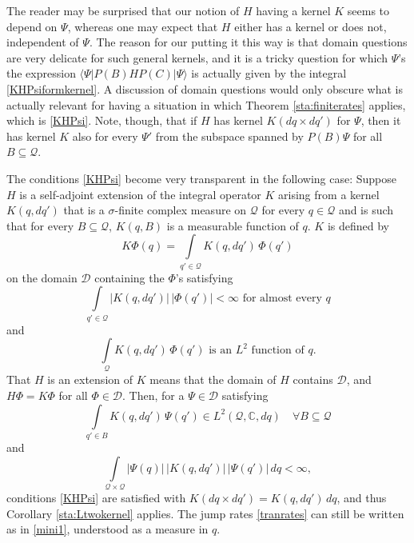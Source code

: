 \documentclass[12pt]{article}
\newcommand{\CCC}{\mathbb{C}} %
\newcommand{\1}{\mathbf{1}} %
\renewcommand{\sp}[2]{\langle #1 | #2 \rangle} %
\newcommand{\conf}{\mathcal{Q}} %
\newcommand{\pov}{{P}}%
\newcommand{\domain}{\mathscr{D}}
\begin{document}
The reader may be surprised that our notion of $H$ having a kernel $K$
seems to depend on $\Psi$, whereas one may expect that $H$ either has
a kernel or does not, independent of $\Psi$. The reason for our
putting it this way is that domain questions are very delicate for
such general kernels, and it is a tricky question for which $\Psi$'s
the expression $\sp{\Psi}{\pov(B) H \pov(C) |\Psi}$ is actually given
by the integral \eqref{KHPsiformkernel}. A discussion of domain
questions would only obscure what is actually relevant for having a
situation in which Theorem \ref{sta:finiterates} applies, which is
\eqref{KHPsi}. Note, though, that if $H$ has kernel $K(dq \times dq')$
for $\Psi$, then it has kernel $K$ also for every $\Psi'$ from the
subspace spanned by $\pov(B) \Psi$ for all $B \subseteq \conf$.

The conditions \eqref{KHPsi} become very transparent in the following
case: Suppose $H$ is a self-adjoint extension of the integral operator
$K$ arising from a kernel $K(q,dq')$ that is a $\sigma$-finite complex
measure on $\conf$ for every $q\in \conf$ and is such that for every
$B \subseteq \conf$, $K(q,B)$ is a measurable function of $q$. $K$ is
defined by
\begin{equation}\label{KK}
   K\Phi(q) = \int\limits_{q' \in\conf} K(q,dq') \, \Phi(q')
\end{equation}
on the domain $\domain$ containing the $\Phi$'s satisfying
\begin{equation}%
   \int\limits_{q' \in \conf} |K(q,dq')| \, |\Phi(q')| < \infty \text{ 
for
   almost every } q
\end{equation}
and
\begin{equation}
   \int\limits_\conf K(q,dq') \, \Phi(q') \text{ is an $L^2$ function of
   }q.
\end{equation}
That $H$ is an extension of $K$ means that the domain of $H$ contains
$\domain$, and $H\Phi = K\Phi$ for all $\Phi \in \domain$. Then, for a
$\Psi \in \domain$ satisfying
\begin{equation}%
   \int\limits_{q' \in B} K(q,dq') \, \Psi(q') \in L^2(\conf, \CCC, dq)
   \quad \forall B \subseteq \conf
\end{equation}
and
\begin{equation}
   \int\limits_{\conf \times \conf} |\Psi(q)| \, |K(q,dq')| \,
   |\Psi(q')| \, dq < \infty,
\end{equation}
conditions \eqref{KHPsi} are satisfied with $K(dq \times dq') =
K(q,dq') \, dq$, and thus Corollary \ref{sta:Ltwokernel} applies.  The
jump rates \eqref{tranrates} can still be written as in \eqref{mini1},
understood as a measure in $q$.
\end{document}
